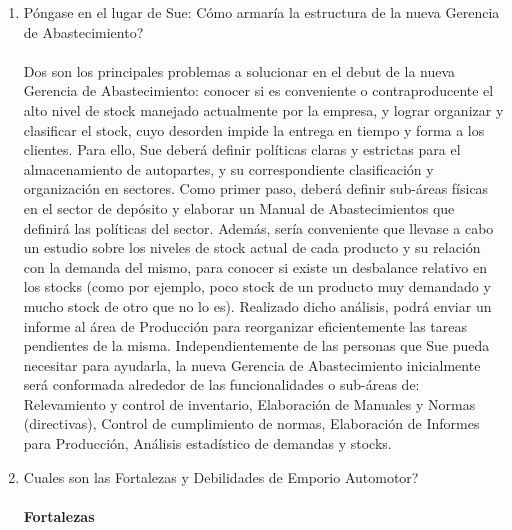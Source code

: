 \documentclass[a4paper,10pt,titlepage]{article}
\begin{document}
\begin{enumerate}
Se encarga de almacenar insumos, repuestos y materiales que se consumen dentro del establecimiento necesarios para el cumplimiento de las tareas de cada \'area. Sus principales funciones son: 
\begin{itemize}
\item Conocimiento de la necesidad.
\item Hacer y esperar el pedido.
\item Recibir los art\'iculos o servicios.
\item Controlar el inventario.
\item Distribuir los productos a los departamentos.
\end{itemize}

  \item P\'ongase en el lugar de Sue: C\'omo armar\'ia la estructura de la nueva Gerencia de Abastecimiento?
  \\ \\
  Dos son los principales problemas a solucionar en el debut de la nueva Gerencia de Abastecimiento: conocer si es conveniente o contraproducente el alto nivel de stock manejado actualmente por la empresa, y lograr organizar y clasificar el stock, cuyo desorden impide la entrega en tiempo y forma a los clientes. Para ello, Sue deber\'a definir pol\'iticas claras y estrictas para el almacenamiento de autopartes, y su correspondiente clasificaci\'on y organizaci\'on en sectores. Como primer paso, deber\'a definir sub-\'areas f\'isicas en el sector de dep\'osito y elaborar un Manual de Abastecimientos que definir\'a las pol\'iticas del sector. Adem\'as, ser\'ia conveniente que llevase a cabo un estudio sobre los niveles de stock actual de cada producto y su relaci\'on con la demanda del mismo, para conocer si existe un desbalance relativo en los stocks (como por ejemplo, poco stock de un producto muy demandado y mucho stock de otro que no lo es). Realizado dicho an\'alisis, podr\'a enviar un informe al \'area de Producci\'on para reorganizar eficientemente las tareas pendientes de la misma. Independientemente de las personas que Sue pueda necesitar para ayudarla, la nueva Gerencia de Abastecimiento inicialmente ser\'a conformada alrededor de las funcionalidades o sub-\'areas de: Relevamiento y control de inventario, Elaboraci\'on de Manuales y Normas (directivas), Control de cumplimiento de normas, Elaboraci\'on de Informes para Producci\'on, An\'alisis estad\'istico de demandas y stocks.
  
  
  \item Cuales son las Fortalezas y Debilidades de Emporio Automotor?\\ 
    \\ \textbf{Fortalezas }\\
    

\end{enumerate}
\end{document}
